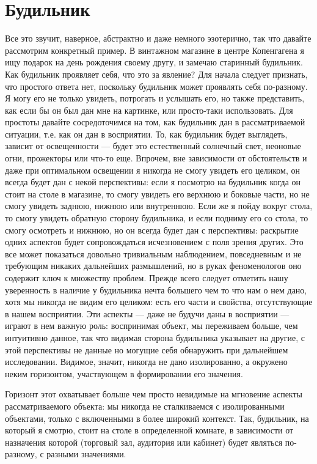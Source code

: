 \documentclass[11pt]{book}
\begin{document}
\section{Будильник}

Все это звучит, наверное, абстрактно и даже немного эзотерично, так что давайте рассмотрим конкретный пример. В винтажном магазине в центре Копенгагена я ищу подарок на день рождения своему другу, и замечаю старинный будильник. Как будильник проявляет себя, что это за явление? Для начала следует признать, что простого ответа нет, поскольку будильник может проявлять себя по-разному. Я могу его не только увидеть, потрогать и услышать его, но также представить, как если бы он был дан мне на картинке, или просто-таки использовать. Для простоты давайте сосредоточимся на том, как будильник дан в рассматриваемой ситуации, т.е. как он дан в восприятии. То, как будильник будет выглядеть, зависит от освещенности --- будет это естественный солнечный свет, неоновые огни, прожекторы или что-то еще. Впрочем, вне зависимости от обстоятельств и даже при оптимальном освещении я никогда не смогу увидеть его целиком, он всегда будет дан с некой перспективы: если я посмотрю на будильник когда он стоит на столе в магазине, то смогу увидеть его верхнюю и боковые части, но не смогу увидеть заднюю, нижнюю или внутреннюю. Если же я пойду вокруг стола, то смогу увидеть обратную сторону будильника, и если подниму его со стола, то смогу осмотреть и нижнюю, но он всегда будет дан с перспективы: раскрытие одних аспектов будет сопровождаться исчезновением с поля зрения других. Это все может показаться довольно тривиальным наблюдением, повседневным и не требующим никаких дальнейших размышлений, но в руках феноменологов оно содержит ключ к множеству проблем. Прежде всего следует отметить нашу уверенность в наличие у будильника нечта большего чем то что нам о нем дано, хотя мы никогда не видим его целиком: есть его части и свойства, отсутствующие в нашем восприятии. Эти аспекты --- даже не будучи даны в восприятии --- играют в нем важную роль: воспринимая объект, мы переживаем больше, чем интуитивно данное, так что видимая сторона будильника указывает на другие, с этой перспективы не данные но могущие себя обнаружить при дальнейшем исследовании. Видимое, значит, никогда не дано изолированно, а окружено неким горизонтом, участвующем в формировании его значения.

Горизонт этот охватывает больше чем просто невидимые на мгновение аспекты рассматриваемого объекта: мы никогда не сталкиваемся с изолированными объектами, только с включенными в более широкий контекст. Так, будильник, на который я смотрю, стоит на столе в определенной комнате, в зависимости от назначения которой (торговый зал, аудитория или кабинет) будет являться по-разному, с разными значениями.
\end{document}
